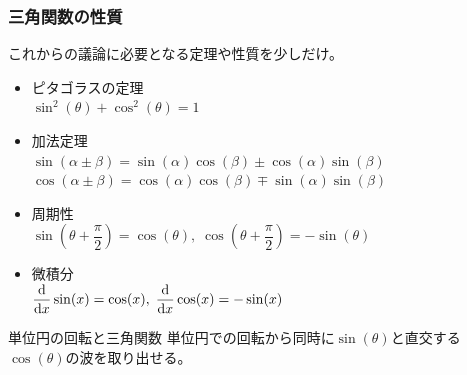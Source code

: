 \documentclass[unicode,12pt,aspectratio=169]{beamer}
\begin{document}
\begin{frame}
	\frametitle{三角関数の性質}

	これからの議論に必要となる定理や性質を少しだけ。
	\vspace{3mm}
	\begin{itemize}
		\item ピタゴラスの定理\\
		$\sin^2(\theta)+\cos^2(\theta)=1$
		\item 加法定理\\
		$\sin(\alpha \pm \beta) = \sin(\alpha) \cos(\beta) \pm \cos(\alpha) \sin(\beta)$\\
		$\cos(\alpha \pm \beta) = \cos(\alpha) \cos(\beta) \mp \sin(\alpha) \sin(\beta)$
		\item 周期性\\
		$\sin \left(\theta + \dfrac{\pi}{2} \right)=\cos(\theta), \; \cos \left(\theta + \dfrac{\pi}{2} \right)=-\sin(\theta)$
		\item 微積分\\
		$\displaystyle \dv{x} \sin(x)=\cos(x), \; \dv{x} \cos(x) =-\sin(x)$
	\end{itemize}

\end{frame}

\begin{frame}{単位円の回転と三角関数}
	単位円での回転から同時に$\sin(\theta)$と直交する$\cos(\theta)$の波を取り出せる。

		\vspace{5mm}
		\centering
\end{frame}
\end{document}
